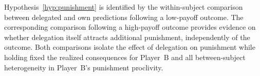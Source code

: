 
Hypothesis~\ref{hyp:punishment} is identified by the within-subject comparison between delegated and own predictions following a low-payoff outcome. The corresponding comparison following a high-payoff outcome provides evidence on whether delegation itself attracts additional punishment, independently of the outcome. Both comparisons isolate the effect of delegation on punishment while holding fixed the realized consequences for Player~B and all between-subject heterogeneity in Player~B's punishment proclivity.



